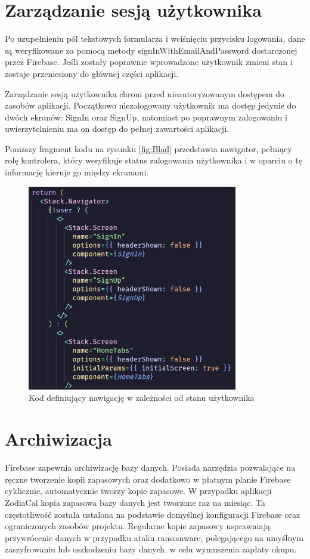 \section*{Zarządzanie sesją użytkownika}
Po uzupełnieniu pól tekstowych formularza i wciśnięciu przycisku logowania, dane są weryfikowane za pomocą metody signInWithEmailAndPassword dostarczonej przez Firebase. Jeśli zostały poprawnie wprowadzone użytkownik zmieni stan i zostaje przeniesiony do głównej części aplikacji.

Zarządzanie sesją użytkownika chroni przed nieautoryzowanym dostępem do zasobów aplikacji. Początkowo niezalogowany użytkownik ma dostęp jedynie do dwóch ekranów: SignIn oraz SignUp, natomiast po poprawnym zalogowaniu
i uwierzytelnieniu ma on dostęp do pełnej zawartości aplikacji.

Poniższy fragment kodu na rysunku \ref{fig:Blad} przedstawia nawigator, pełniący rolę kontrolera, który weryfikuje status zalogowania użytkownika i w oparciu o tę informację kieruje go między ekranami.

\begin{figure}[ht]
	\centering
	\vspace{0.25cm}
	\includegraphics[height=9cm]{images/bezpieczenstwo/nawigator}
	\caption{Kod definiujący nawigację w zależności od stanu użytkownika}
	\label{fig:Nawigator}
\end{figure}


\section*{Archiwizacja}
Firebase zapewnia archiwizację bazy danych. Posiada narzędzia pozwalające na ręczne tworzenie kopii zapasowych oraz dodatkowo w płatnym planie Firebase cyklicznie, automatycznie tworzy kopie zapasowe. W przypadku aplikacji ZodiaCal kopia zapasowa bazy danych jest tworzone raz na miesiąc. Ta częstotliwość została ustalona na podstawie domyślnej konfiguracji Firebase oraz ograniczonych zasobów projektu.
Regularne kopie zapasowy usprawniają przywrócenie danych w przypadku ataku ransomware, polegającego na umyślnym zaszyfrowaniu lub uszkodzeniu bazy danych, w celu wymuszenia zapłaty okupu.

